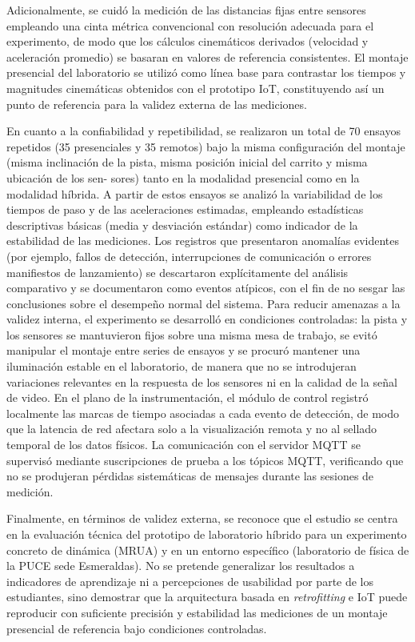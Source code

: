 \documentclass[journal,article,submit,pdftex]{Definitions/mdpi}
\begin{document}
Adicionalmente, se cuid\'o la medici\'on de las distancias fijas entre sensores empleando una cinta m\'etrica convencional con resoluci\'on adecuada para el experimento, de modo que los c\'alculos cinem\'aticos derivados (velocidad y aceleraci\'on promedio) se basaran en valores de referencia consistentes. El montaje presencial del laboratorio se utiliz\'o como l\'inea base para contrastar los tiempos y magnitudes cinem\'aticas obtenidos con el prototipo IoT, constituyendo as\'i un punto de referencia para la validez externa de las mediciones.

En cuanto a la confiabilidad y repetibilidad, se realizaron un total de 70 ensayos repetidos (35 presenciales y 35 remotos) bajo la misma configuraci\'on del montaje (misma inclinaci\'on de la pista, misma posici\'on inicial del carrito y misma ubicaci\'on de los sen- sores) tanto en la modalidad presencial como en la modalidad h\'ibrida. A partir de estos ensayos se analiz\'o la variabilidad de los tiempos de paso y de las aceleraciones estimadas, empleando estad\'isticas descriptivas b\'asicas (media y desviaci\'on est\'andar) como indicador de la estabilidad de las mediciones. Los registros que presentaron anomal\'ias evidentes (por ejemplo, fallos de detecci\'on, interrupciones de comunicaci\'on o errores manifiestos de lanzamiento) se descartaron expl\'icitamente del an\'alisis comparativo y se documentaron como eventos at\'ipicos, con el fin de no sesgar las conclusiones sobre el desempe\~no normal del sistema. Para reducir amenazas a la validez interna, el experimento se desarroll\'o en condiciones controladas: la pista y los sensores se mantuvieron fijos sobre una misma mesa de trabajo, se evit\'o manipular el montaje entre series de ensayos y se procur\'o mantener una iluminaci\'on estable en el laboratorio, de manera que no se introdujeran variaciones relevantes en la respuesta de los sensores ni en la calidad de la se\~nal de video. En el plano de la instrumentaci\'on, el m\'odulo de control registr\'o localmente las marcas de tiempo asociadas a cada evento de detecci\'on, de modo que la latencia de red afectara solo a la visualizaci\'on remota y no al sellado temporal de los datos f\'isicos. La comunicaci\'on con el servidor MQTT se supervis\'o mediante suscripciones de prueba a los t\'opicos MQTT, verificando que no se produjeran p\'erdidas sistem\'aticas de mensajes durante las sesiones de medici\'on.

Finalmente, en t\'erminos de validez externa, se reconoce que el estudio se centra en la evaluaci\'on t\'ecnica del prototipo de laboratorio h\'ibrido para un experimento concreto de din\'amica (MRUA) y en un entorno espec\'ifico (laboratorio de f\'isica de la PUCE sede Esmeraldas). No se pretende generalizar los resultados a indicadores de aprendizaje ni a percepciones de usabilidad por parte de los estudiantes, sino demostrar que la arquitectura basada en \textit{retrofitting} e IoT puede reproducir con suficiente precisi\'on y estabilidad las mediciones de un montaje presencial de referencia bajo condiciones controladas.
\end{document}
